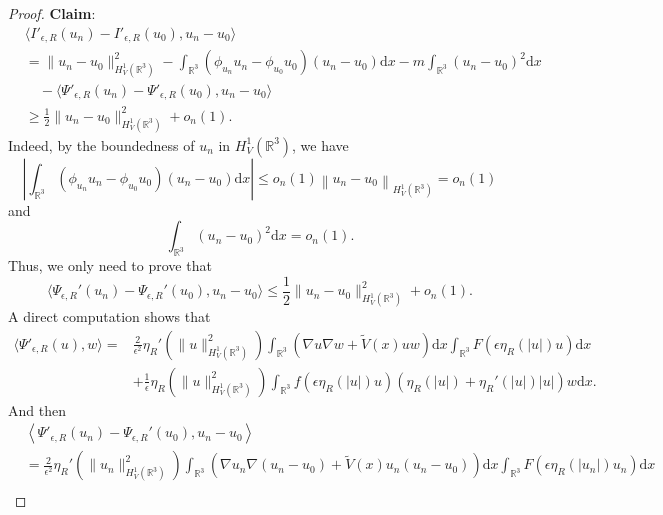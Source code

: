 \documentclass[12pt]{amsart}
\numberwithin{equation}{section}
\theoremstyle{definition}
\begin{document}
\begin{proof}
{\bf Claim}:
\begin{equation*}
    \begin{aligned}
     &\langle I'_{\epsilon,R}(u_n) - I'_{\epsilon,R}(u_0), u_n - u_0 \rangle \\
&= \|u_n - u_0\|_{H^1_V(\mathbb{R}^3)}^2-\int_{\mathbb{R}^3} (\phi_{u_n}u_n - \phi_{u_0}u_0)(u_n - u_0) \text{d}x -m\int_{\mathbb{R}^3}(u_n-u_0)^2\text{d}x\\
&\quad- \langle \Psi'_{\epsilon,R}(u_n) - \Psi'_{\epsilon,R}(u_0), u_n - u_0 \rangle\\
&\geq \frac{1}{2}\|u_n-u_0\|_{H^{1}_V(\mathbb{R}^3)}^{2}+o_n(1).
    \end{aligned}
\end{equation*}
Indeed, by the boundedness of ${u_n}$ in $H^{1}_{V}(\mathbb{R}^3)$, we have
\begin{equation*}
    \left |\int_{\mathbb{R}^{3}}\left ( \phi _{u_{n}} u_{n}-\phi _{u_{0}}u_{0}\right )\left ( u_{n}-u_{0} \right ) \text{d}x\right |\leq o_{n}\left ( 1 \right )\left\| u_{n}-u_{0}\right\|_{H^{1}_{V}(\mathbb{R}^3)}=o_{n}\left ( 1 \right )
\end{equation*}
and
\begin{equation*}
    \int_{\mathbb{R}^3}(u_n-u_0)^2\text{d}x=o_{n}(1).
\end{equation*}
Thus, we only need to prove that
\begin{equation*}
    \langle \Psi_{\epsilon,R}'(u_n) - \Psi_{\epsilon,R}'(u_0), u_n - u_0 \rangle \leq\frac{1}{2}\|u_n-u_0\|_{H^{1}_V(\mathbb{R}^3)}^{2}+o_n(1).
\end{equation*}
A direct computation shows that
\begin{align*}
\langle \Psi'_{\epsilon,R}(u), w \rangle =
& \frac{2}{\epsilon^2} \eta_R'(\|u\|_{H^1_{V}(\mathbb{R}^3)}^2) \int_{\mathbb{R}^3}(\nabla u\nabla w+\tilde V(x)uw) \text{d}x \int_{\mathbb{R}^3} F(\epsilon \eta_R(|u|) u)  \text{d}x \\
&+ \frac{1}{\epsilon} \eta_R(\|u\|_{H^1_{V}(\mathbb{R}^3)}^2) \int_{\mathbb{R}^3} f(\epsilon \eta_R(|u|) u) \left(\eta_R(|u|) + \eta_R'(|u|)|u| \right) w \text{d}x.
\end{align*}
And then
\begin{align}
      &\left<  \Psi'_{\epsilon,R} \left ( u_{n} \right )-\Psi_{\epsilon ,R}'\left ( u_{0} \right ),u_{n}-u_{0}\right>\nonumber \\
      &= \frac{2}{\epsilon^2} \eta_R'(\|u_n\|_{H^1_{V}(\mathbb{R}^3)}^2) \int_{\mathbb{R}^3}(\nabla u_n\nabla (u_{n}-u_{0})+\tilde V(x)u_n(u_{n}-u_{0})) \text{d}x \int_{\mathbb{R}^3} F(\epsilon \eta_R(|u_n|) u_n) \text{d}x \tag{T1}\\

\end{align}
\end{proof}
\end{document}
